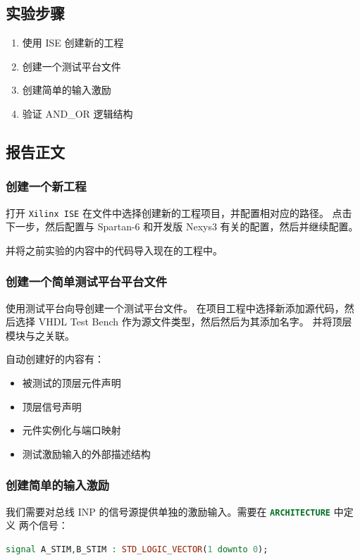 \documentclass{ctexart}
\begin{document}
\subsection{实验步骤}

\begin{enumerate}
    \item 使用 ISE 创建新的工程
    \item 创建一个测试平台文件
    \item 创建简单的输入激励
    \item 验证 AND\_OR 逻辑结构
\end{enumerate}


\subsection{报告正文}

\subsubsection{创建一个新工程}

打开 \verb|Xilinx ISE| 在文件中选择创建新的工程项目，并配置相对应的路径。
点击下一步，然后配置与 Spartan-6 和开发版 Nexys3 有关的配置，然后并继续配置。

并将之前实验的内容中的代码导入现在的工程中。

\subsubsection{创建一个简单测试平台平台文件}

使用测试平台向导创建一个测试平台文件。
在项目工程中选择新添加源代码，然后选择 VHDL Test Bench 作为源文件类型，然后然后为其添加名字。
并将顶层模块与之关联。

自动创建好的内容有：
\begin{itemize}
    \item 被测试的顶层元件声明
    \item 顶层信号声明
    \item 元件实例化与端口映射
    \item 测试激励输入的外部描述结构
\end{itemize}

\subsubsection{创建简单的输入激励}

我们需要对总线 INP 的信号源提供单独的激励输入。需要在 \lstinline[language=VHDL]|ARCHITECTURE| 中定义
两个信号：
\begin{lstlisting}[language=VHDL]
signal A_STIM,B_STIM : STD_LOGIC_VECTOR(1 downto 0);
\end{lstlisting}
\end{document}
